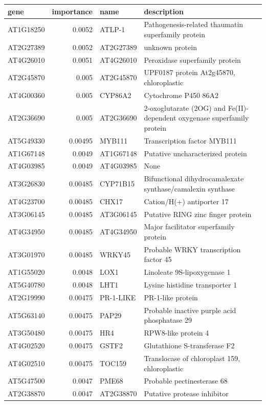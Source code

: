 \documentclass[11pt]{article}
\begin{document}
\begin{center}
\begin{tabular}{lrll}
gene & importance & name & description\\
\hline
AT1G18250 & 0.0052 & ATLP-1 & Pathogenesis-related thaumatin superfamily protein\\
AT2G27389 & 0.0052 & AT2G27389 & unknown protein\\
AT4G26010 & 0.0051 & AT4G26010 & Peroxidase superfamily protein\\
AT2G45870 & 0.005 & AT2G45870 & UPF0187 protein At2g45870, chloroplastic\\
AT4G00360 & 0.005 & CYP86A2 & Cytochrome P450 86A2\\
AT2G36690 & 0.005 & AT2G36690 & 2-oxoglutarate (2OG) and Fe(II)-dependent oxygenase superfamily protein\\
AT5G49330 & 0.00495 & MYB111 & Transcription factor MYB111\\
AT1G67148 & 0.0049 & AT1G67148 & Putative uncharacterized protein\\
AT4G03985 & 0.0049 & AT4G03985 & None\\
AT3G26830 & 0.00485 & CYP71B15 & Bifunctional dihydrocamalexate synthase/camalexin synthase\\
AT4G23700 & 0.00485 & CHX17 & Cation/H(+) antiporter 17\\
AT3G06145 & 0.00485 & AT3G06145 & Putative RING zinc finger protein\\
AT4G34950 & 0.00485 & AT4G34950 & Major facilitator superfamily protein\\
AT3G01970 & 0.00485 & WRKY45 & Probable WRKY transcription factor 45\\
AT1G55020 & 0.0048 & LOX1 & Linoleate 9S-lipoxygenase 1\\
AT5G40780 & 0.0048 & LHT1 & Lysine histidine transporter 1\\
AT2G19990 & 0.00475 & PR-1-LIKE & PR-1-like protein\\
AT5G63140 & 0.00475 & PAP29 & Probable inactive purple acid phosphatase 29\\
AT3G50480 & 0.00475 & HR4 & RPW8-like protein 4\\
AT4G02520 & 0.00475 & GSTF2 & Glutathione S-transferase F2\\
AT4G02510 & 0.00475 & TOC159 & Translocase of chloroplast 159, chloroplastic\\
AT5G47500 & 0.0047 & PME68 & Probable pectinesterase 68\\
AT2G38870 & 0.0047 & AT2G38870 & Putative protease inhibitor\\

\end{tabular}
\end{center}
\end{document}
